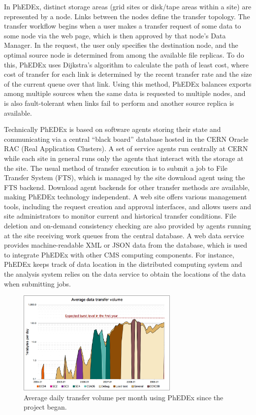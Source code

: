 In PhEDEx, distinct storage areas (grid sites or disk/tape areas
within a site) are represented by a node.  Links between the nodes
define the transfer topology.  The transfer workflow begins when a
user makes a transfer request of some data to some node via the web
page, which is then approved by that node's Data Manager.  In the
request, the user only specifies the destination node, and the optimal
source node is determined from among the available file replicas.  To
do this, PhEDEx uses Dijkstra's algorithm to calculate the path of
least cost, where cost of transfer for each link is determined by the
recent transfer rate and the size of the current queue over that link.
Using this method, PhEDEx balances exports among multiple sources when
the same data is requested to multiple nodes, and is also
fault-tolerant when links fail to perform and another source replica
is available.

Technically PhEDEx is based on software agents storing their state and
communicating via a central ``black board'' database hosted in the
CERN Oracle RAC (Real Application Clusters). A set of service agents
run centrally at CERN while each site in general runs
only the agents that interact with the storage at the site. The usual
method of transfer execution is to submit a job to File Transfer System (FTS), 
which is managed by the site download agent using the FTS backend.  Download
agent backends for other transfer methods are available, making PhEDEx
technology independent. A web site offers various management tools,
including the request creation and approval interfaces, and allows
users and site administrators to monitor current and historical
transfer conditions.  File deletion and on-demand consistency checking
are also provided by agents running at the site receiving work queues
from the central database.  A web data service provides
machine-readable XML or JSON data from the database, which is used to
integrate PhEDEx with other CMS computing components.  For instance,
PhEDEx keeps track of data location in the distributed computing
system and the analysis system relies on the data service to obtain
the locations of the data when submitting jobs.

\begin{figure}
 \includegraphics[width=0.70\textwidth]{figures/phedex-avg-monthly-volume.png}
\caption{Average daily transfer volume per month using PhEDEx since the project began.}
\label{fig:phedex-transfers}
\end{figure}

